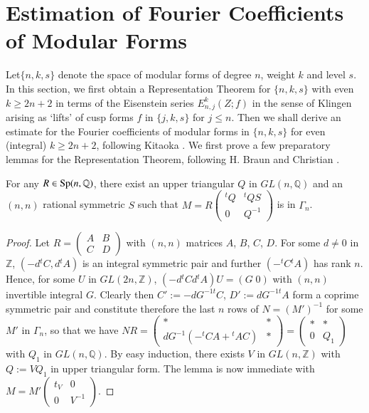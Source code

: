 \section{Estimation of Fourier Coefficients of Modular
  Forms}\label{c1:sec-1.6}

Let\pageoriginale  $\{n,k,s\}$ denote the space of modular forms of
degree $n$, 
weight $k$ and level $s$. In this section, we first obtain a
Representation Theorem for $\{n,k,s\}$ with even $k\geq 2n+2$ in terms
of the Eisenstein series $E^{k}_{n,j}(Z;f)$ in the sense of Klingen
\cite{key13} arising as `lifts' of cusp forms $f$ in $\{j,k,s\}$ for
$j\leq n$. Then we shall derive an estimate for the Fourier
coefficients of modular forms in $\{n,k,s\}$ for even (integral)
$k\geq 2n+2$, following Kitaoka \cite{key10}. We first prove a few
preparatory lemmas for the Representation Theorem, following H.\@
Braun \cite{key3} and Christian \cite{key6}.

\begin{sublemma}\label{c1:lem-1.6.1}
For any $R\in \operatorname{Sp}(n,\mathbb{Q})$, there exist an upper triangular $Q$
in $GL(n,\mathbb{Q})$ and an $(n,n)$ rational symmetric $S$ such that
$M=R\left(\begin{smallmatrix} {}^{t}Q & {}^{t}QS\\ 0 & Q^{-1}
\end{smallmatrix}\right)$ is in $\Gamma_{n}$.
\end{sublemma}

\begin{proof}
Let $R=\left(\begin{smallmatrix} A & B\\ C & D
\end{smallmatrix}\right)$ with $(n,n)$ matrices $A$, $B$, $C$,
$D$. For some $d\neq 0$ in $\mathbb{Z}$, $(-d{}^{t}C, d{}^{t}A)$ is an
integral symmetric pair and further $(-{}^{t}C{}^{t}A)$ has rank
$n$. Hence, for some $U$ in $GL(2n,\mathbb{Z})$,
$(-d{}^{t}Cd{}^{t}A)U=(G \; 0)$ with $(n,n)$ invertible integral
$G$. Clearly then $C':=-dG^{-1t}C$, $D':=dG^{-1t}A$ form a coprime
symmetric pair and constitute therefore the last $n$ rows of
$N=(M')^{-1}$ for some $M'$ in $\Gamma_{n}$, so that we have
$NR=\left(\begin{smallmatrix} \ast &
  \ast\\ dG^{-1}(-{}^{t}CA+{}^{t}AC) & \ast
\end{smallmatrix}\right)=\left(\begin{smallmatrix} \ast & \ast\\ 0 &
  Q_{1}
\end{smallmatrix}\right)$ with $Q_{1}$ in $GL(n,\mathbb{Q})$. By easy
induction, there exists $V$ in $GL(n,\mathbb{Z})$ with $Q:=VQ_{1}$ in
upper triangular form. The lemma is now immediate with
$M=M'\left(\begin{smallmatrix} t_{V} & 0\\ 0 & V^{-1}
\end{smallmatrix}\right)$. 
\end{proof}


